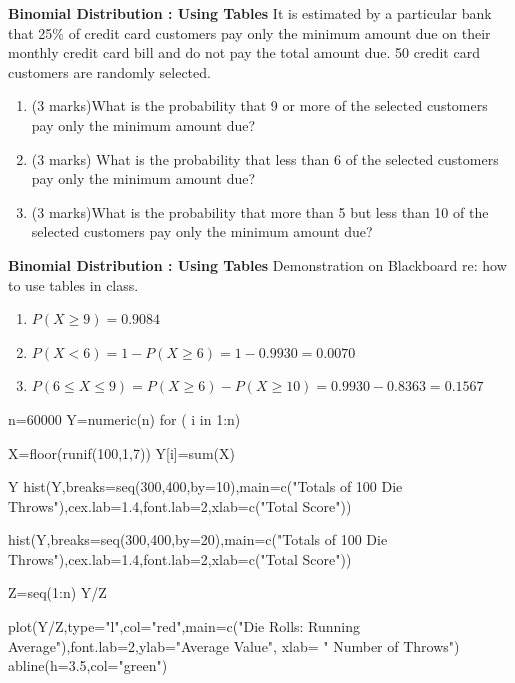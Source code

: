 \documentclass[]{report}
\begin{document}
{
\textbf{Binomial Distribution : Using Tables}
It is estimated by a particular bank that 25\% of credit card customers pay only the minimum amount due on their monthly credit card bill and do not pay the total amount due. 50 credit card customers are randomly selected.
\begin{enumerate}
\item  (3 marks)What is the probability that 9 or more of the selected customers pay only the minimum amount due?
\item  (3 marks) What is the probability that less than 6 of the selected customers pay only the minimum amount due?
\item  (3 marks)What is the probability that more than 5 but less than 10 of the selected customers pay only the minimum amount due?
\end{enumerate}

}

{
\textbf{Binomial Distribution : Using Tables}
Demonstration on Blackboard re: how to use tables in class.
\begin{enumerate}
\item  $P(X \geq 9) = 0.9084$
\item  $P(X < 6) = 1- P(X \geq 6) =1 - 0.9930 = 0.0070$
\item  $P(6 \leq X \leq 9) = P(X \geq 6) - P(X \geq 10) = 0.9930 - 0.8363 = 0.1567$
\end{enumerate}

}







n=60000
Y=numeric(n)
for ( i in 1:n){

X=floor(runif(100,1,7))
Y[i]=sum(X)
}

Y
hist(Y,breaks=seq(300,400,by=10),main=c("Totals of 100 Die Throws"),cex.lab=1.4,font.lab=2,xlab=c("Total Score"))

hist(Y,breaks=seq(300,400,by=20),main=c("Totals of 100 Die Throws"),cex.lab=1.4,font.lab=2,xlab=c("Total Score"))



Z=seq(1:n)
Y/Z

plot(Y/Z,type="l",col="red",main=c("Die Rolls: Running Average"),font.lab=2,ylab="Average Value", xlab=
" Number of Throws")
abline(h=3.5,col="green")
\end{document}
